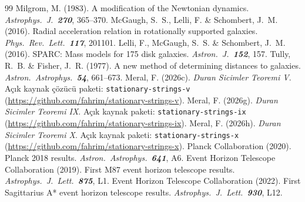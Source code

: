\documentclass[12pt,a4paper]{article}
\begin{document}
\begin{thebibliography}{99}
     Milgrom, M. (1983). A modification of the Newtonian dynamics.
    \textit{Astrophys.\ J.\ \textbf{270}}, 365--370.
     McGaugh, S.~S., Lelli, F. \& Schombert, J.~M. (2016).
    Radial acceleration relation in rotationally supported galaxies.
    \textit{Phys.\ Rev.\ Lett.\ \textbf{117}}, 201101.
     Lelli, F., McGaugh, S.~S. \& Schombert, J.~M. (2016).
    SPARC: Mass models for 175 disk galaxies.
    \textit{Astron.\ J.\ \textbf{152}}, 157.
     Tully, R.~B. \& Fisher, J.~R. (1977). A new method of
    determining distances to galaxies. \textit{Astron.\ Astrophys.\ \textbf{54}}, 661--673.
     Meral, F. (2026c). \textit{Duran Sicimler Teoremi V}.
    Açık kaynak çözücü paketi: \texttt{stationary-strings-v}
    (\url{https://github.com/fahrim/stationary-strings-v}).
     Meral, F. (2026g). \textit{Duran Sicimler Teoremi IX}.
    Açık kaynak paketi: \texttt{stationary-strings-ix}
    (\url{https://github.com/fahrim/stationary-strings-ix}).
     Meral, F. (2026h). \textit{Duran Sicimler Teoremi X}.
    Açık kaynak paketi: \texttt{stationary-strings-x}
    (\url{https://github.com/fahrim/stationary-strings-x}).
     Planck Collaboration (2020). Planck 2018 results.
    \textit{Astron.\ Astrophys.\ \textbf{641}}, A6.
     Event Horizon Telescope Collaboration (2019).
    First M87 event horizon telescope results. \textit{Astrophys.\ J.\ Lett.\
    \textbf{875}}, L1.
     Event Horizon Telescope Collaboration (2022).
    First Sagittarius A* event horizon telescope results.
    \textit{Astrophys.\ J.\ Lett.\ \textbf{930}}, L12.
\end{thebibliography}
\end{document}
